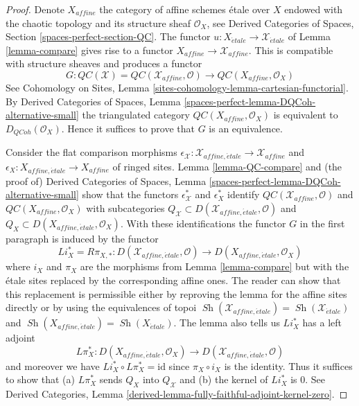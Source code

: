 \documentclass{stacks-project}
\theoremstyle{plain}
\theoremstyle{definition}
\theoremstyle{remark}
\numberwithin{equation}{subsection}
\def\Sh{\mathop{\mathit{Sh}}\nolimits}
\def\etale{{\acute{e}tale}}
\def\QCoh{\mathit{QCoh}}
\begin{document}
\begin{proof}
Denote $X_{affine}$ the category of affine schemes \'etale over $X$
endowed with the chaotic topology and its structure sheaf $\mathcal{O}_X$, see
Derived Categories of Spaces, Section \ref{spaces-perfect-section-QC}.
The functor $u : X_\etale \to \mathcal{X}_\etale$ of Lemma \ref{lemma-compare}
gives rise to a functor $X_{affine} \to \mathcal{X}_{affine}$.
This is compatible with structure sheaves and produces a functor
$$
G :
\mathit{QC}(\mathcal{X}) = \mathit{QC}(\mathcal{X}_{affine}, \mathcal{O})
\longrightarrow
\mathit{QC}(X_{affine}, \mathcal{O}_X)
$$
See
Cohomology on Sites, Lemma \ref{sites-cohomology-lemma-cartesian-functorial}.
By Derived Categories of Spaces, Lemma
\ref{spaces-perfect-lemma-DQCoh-alternative-small}
the triangulated category $\mathit{QC}(X_{affine}, \mathcal{O}_X)$
is equivalent to $D_\QCoh(\mathcal{O}_X)$. Hence it suffices to
prove that $G$ is an equivalence.

\medskip\noindent
Consider the flat comparison morphisms
$\epsilon_\mathcal{X} : \mathcal{X}_{affine, \etale} \to \mathcal{X}_{affine}$
and $\epsilon_X : X_{affine, \etale} \to X_{affine}$
of ringed sites. Lemma \ref{lemma-QC-compare} and
(the proof of) Derived Categories of Spaces, Lemma
\ref{spaces-perfect-lemma-DQCoh-alternative-small}
show that the functors
$\epsilon_\mathcal{X}^*$ and $\epsilon_X^*$
identify $\mathit{QC}(\mathcal{X}_{affine}, \mathcal{O})$
and $\mathit{QC}(X_{affine}, \mathcal{O}_X)$
with subcategories
$Q_\mathcal{X} \subset D(\mathcal{X}_{affine, \etale}, \mathcal{O})$
and
$Q_X \subset D(X_{affine, \etale}, \mathcal{O}_X)$.
With these identifications
the functor $G$ in the first paragraph is induced by the functor
$$
Li_X^* = R\pi_{X, *}:
D(\mathcal{X}_{affine, \etale}, \mathcal{O})
\longrightarrow
D(X_{affine, \etale}, \mathcal{O}_X)
$$
where $i_X$ and $\pi_X$ are the morphisms from Lemma \ref{lemma-compare}
but with the \'etale sites replaced by the corresponding affine ones.
The reader can show that this replacement is permissible either
by reproving the lemma for the affine sites directly or
by using the equivalences of topoi
$\Sh(\mathcal{X}_{affine, \etale}) = \Sh(\mathcal{X}_\etale)$ and
$\Sh(X_{affine, \etale}) = \Sh(X_\etale)$.
The lemma also tells us $Li_X^*$ has a left adjoint
$$
L\pi_X^*:
D(X_{affine, \etale}, \mathcal{O}_X)
\longrightarrow
D(\mathcal{X}_{affine, \etale}, \mathcal{O})
$$
and moreover we have $Li_X^* \circ L\pi_X^* = \text{id}$
since $\pi_X \circ i_X$ is the identity. Thus it suffices
to show that (a) $L\pi_X^*$ sends $Q_X$ into $Q_\mathcal{X}$
and (b) the kernel of $Li_X^*$ is $0$.
See Derived Categories, Lemma
\ref{derived-lemma-fully-faithful-adjoint-kernel-zero}.


\end{proof}
\end{document}
